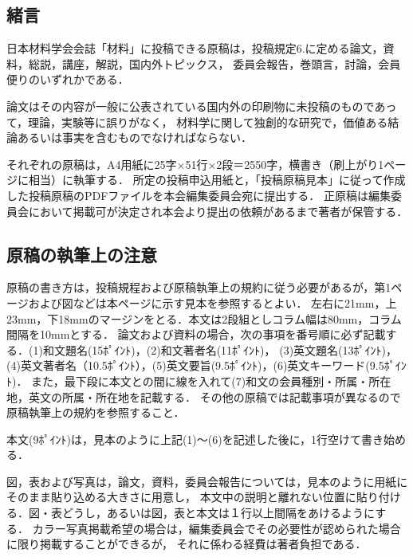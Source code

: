 \documentclass{ujarticle}
\begin{document}
\vspace*{-2mm}
{\small  %
\begin{multicols}{2}
\baselineskip 14.1pt
\section{緒\hspace{4zw}言}

日本材料学会会誌「材料」に投稿できる原稿は，投稿規定6.に定める論文，資料，総説，講座，解説，国内外トピックス，
委員会報告，巻頭言，討論，会員便りのいずれかである．

論文はその内容が一般に公表されている国内外の印刷物に未投稿のものであって，理論，実験等に誤りがなく，
材料学に関して独創的な研究で，価値ある結論あるいは事実を含むものでなければならない．

それぞれの原稿は，A4用紙に25字×51行×2段＝2550字，横書き（刷上がり1ページに相当）に執筆する．
所定の投稿申込用紙と，「投稿原稿見本」に従って作成した投稿原稿のPDFファイルを本会編集委員会宛に提出する．
正原稿は編集委員会において掲載可が決定され本会より提出の依頼があるまで著者が保管する．

\subsection{原稿の執筆上の注意}

原稿の書き方は，投稿規程および原稿執筆上の規約に従う必要があるが，第1ページおよび図などは本ページに示す見本を参照するとよい．
左右に21mm，上23mm，下18mmのマージンをとる．本文は2段組としコラム幅は80mm，コラム間隔を10mmとする．
論文および資料の場合，次の事項を番号順に必ず記載する．(1)和文題名(15ﾎﾟｲﾝﾄ)，(2)和文著者名(11ﾎﾟｲﾝﾄ)，
(3)英文題名(13ﾎﾟｲﾝﾄ)，(4)英文著者名（10.5ﾎﾟｲﾝﾄ），(5)英文要旨(9.5ﾎﾟｲﾝﾄ)，(6)英文キーワード(9.5ﾎﾟｲﾝﾄ)．
また，最下段に本文との間に線を入れて(7)和文の会員種別・所属・所在地，英文の所属・所在地を記載する．
その他の原稿では記載事項が異なるので原稿執筆上の規約を参照すること．

本文(9ﾎﾟｲﾝﾄ)は，見本のように上記(1)～(6)を記述した後に，1行空けて書き始める．

図，表および写真は，論文，資料，委員会報告については，見本のように用紙にそのまま貼り込める大きさに用意し，
本文中の説明と離れない位置に貼り付ける．図・表どうし，あるいは図，表と本文は１行以上間隔をあけるようにする．
カラー写真掲載希望の場合は，編集委員会でその必要性が認められた場合に限り掲載することができるが，
それに係わる経費は著者負担である．
\newpage

\end{multicols}}
\end{document}
